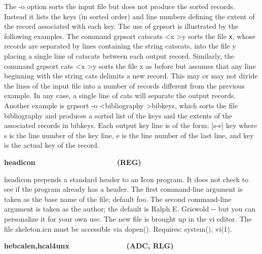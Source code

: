 The \textsf{{}-o} option sorts the input file but does not produce the
sorted records. Instead it lists the keys (in sorted order) and line
numbers defining the extent of the record associated with each key. The
use of grpsort is illustrated by the following examples. The command
\textsf{grpsort {\textquotedbl}catscats{\textquotedbl} {\textless}x
{\textgreater}y} sorts the file \texttt{x}, whose records are separated
by lines containing the string
\textsf{{\textquotedbl}catscats{\textquotedbl}}, into the file
\textsf{y} placing a single line of
\textsf{{\textquotedbl}catscats{\textquotedbl}} between each output
record. Similarly, the command \textsf{grpsort
{\textquotedbl}cats{\textquotedbl} {\textless}x {\textgreater}y} sorts
the file \textsf{x} as before but assumes that any line beginning with
the string \textsf{{\textquotedbl}cats{\textquotedbl}} delimits a new
record. This may or may not divide the lines of the input file into a
number of records different from the previous example. In any case, a
single line of \textsf{{\textquotedbl}cats{\textquotedbl}} will
separate the output records. Another example is \textsf{grpsort -o
{\textless}bibliography {\textgreater}bibkeys}, which sorts the file
bibliography and produces a sorted list of the keys and the extents of
the associated records in bibkeys. Each output key line is of the form:
\textsf{[s-e] key} where \textsf{s} is the line number of the key line,
\textsf{e} is the line number of the last line, and \textsf{key} is the
actual key of the record.

{\sffamily\bfseries
headicon\ \ \ \ \ \ \ \ \ \ \ \ \ \ \ \ \ \ \ \ (REG)}

\textsf{headicon} prepends a standard header to an Icon program. It does
not check to see if the program already has a header. The first
command-line argument is taken as the base name of the file; default
{\textquotedbl}foo{\textquotedbl}. The second command-line argument is
taken as the author; the default is \textsf{{\textquotedbl}Ralph E.
Griswold{\textquotedbl}} -{}- but you can personalize it for your own
use. The new file is brought up in the vi editor. The
file \textsf{skeleton.icn} must be accessible via \textsf{dopen()}.
Requires: system(), vi(1).

{\sffamily\bfseries
hebcalen,hcal4unx\ \ \ \ \ \ \ \ \ \ \ \ \ \ (ADC, RLG)}

